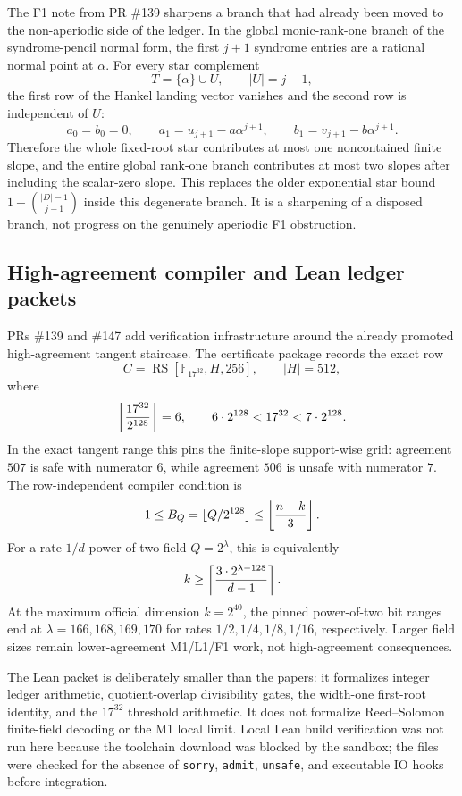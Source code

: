 \documentclass[11pt]{article}
\newcommand{\F}{\mathbb F}
\newcommand{\RS}{\operatorname{RS}}
\begin{document}
The F1 note from PR \#139 sharpens a branch that had already been moved to the
non-aperiodic side of the ledger.  In the global monic-rank-one branch of the
syndrome-pencil normal form, the first \(j+1\) syndrome entries are a rational
normal point at \(\alpha\).  For every star complement
\[
  T=\{\alpha\}\cup U,\qquad |U|=j-1,
\]
the first row of the Hankel landing vector vanishes and the second row is
independent of \(U\):
\[
  a_0=b_0=0,\qquad
  a_1=u_{j+1}-a\alpha^{j+1},\qquad
  b_1=v_{j+1}-b\alpha^{j+1}.
\]
Therefore the whole fixed-root star contributes at most one noncontained
finite slope, and the entire global rank-one branch contributes at most two
slopes after including the scalar-zero slope.  This replaces the older
exponential star bound \(1+\binom{|D|-1}{j-1}\) inside this degenerate branch.
It is a sharpening of a disposed branch, not progress on the genuinely
aperiodic F1 obstruction.

\subsection{High-agreement compiler and Lean ledger packets}

PRs \#139 and \#147 add verification infrastructure around the already promoted
high-agreement tangent staircase.  The certificate package records the exact
row
\[
  C=\RS[\F_{17^{32}},H,256],\qquad |H|=512,
\]
where
\[
  \left\lfloor {17^{32}\over2^{128}}\right\rfloor=6,\qquad
  6\cdot2^{128}<17^{32}<7\cdot2^{128}.
\]
In the exact tangent range this pins the finite-slope support-wise grid:
agreement \(507\) is safe with numerator \(6\), while agreement \(506\) is
unsafe with numerator \(7\).  The row-independent compiler condition is
\[
  1\le B_Q=\lfloor Q/2^{128}\rfloor
     \le \left\lfloor {n-k\over3}\right\rfloor .
\]
For a rate \(1/d\) power-of-two field \(Q=2^\lambda\), this is equivalently
\[
  k\ge
  \left\lceil {3\cdot2^{\lambda-128}\over d-1}\right\rceil .
\]
At the maximum official dimension \(k=2^{40}\), the pinned power-of-two bit
ranges end at \(\lambda=166,168,169,170\) for rates
\(1/2,1/4,1/8,1/16\), respectively.  Larger field sizes remain lower-agreement
M1/L1/F1 work, not high-agreement consequences.

The Lean packet is deliberately smaller than the papers: it formalizes integer
ledger arithmetic, quotient-overlap divisibility gates, the width-one
first-root identity, and the \(17^{32}\) threshold arithmetic.  It does not
formalize Reed--Solomon finite-field decoding or the M1 local limit.  Local
Lean build verification was not run here because the toolchain download was
blocked by the sandbox; the files were checked for the absence of
\texttt{sorry}, \texttt{admit}, \texttt{unsafe}, and executable IO hooks before
integration.
\end{document}
